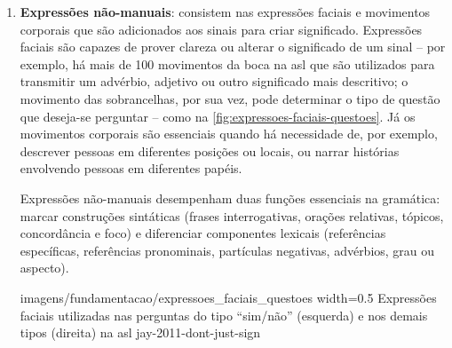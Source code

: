 \begin{enumerate}



    \item \textbf{Expressões não-manuais}: consistem nas expressões faciais e movimentos corporais que são adicionados aos sinais para criar significado. 
    Expressões faciais são capazes de prover clareza ou alterar o significado de um sinal -- por exemplo, há mais de 100 movimentos da boca na \acrshort{asl} que são utilizados para transmitir um advérbio, adjetivo ou outro significado mais descritivo; o movimento das sobrancelhas, por sua vez, pode determinar o tipo de questão que deseja-se perguntar -- como na \autoref{fig:expressoes-faciais-questoes}.
    Já os movimentos corporais são essenciais quando há necessidade de, por exemplo, descrever pessoas em diferentes posições ou locais, ou narrar histórias envolvendo pessoas em diferentes papéis.

    Expressões não-manuais desempenham duas funções essenciais na gramática: marcar construções sintáticas (frases interrogativas, orações relativas, tópicos, concordância e foco) e diferenciar componentes lexicais (referências específicas, referências pronominais, partículas negativas, advérbios, grau ou aspecto). 
    
        {imagens/fundamentacao/expressoes_faciais_questoes} %
        {width=0.5\linewidth} %
        {Expressões faciais utilizadas nas perguntas do tipo ``sim/não'' (esquerda) e nos demais tipos (direita) na \acrshort{asl}} %
        {jay-2011-dont-just-sign} %


\end{enumerate}
